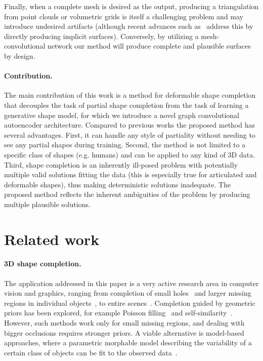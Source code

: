 \documentclass[10pt,twocolumn,letterpaper]{article}
\begin{document}
Finally, when a complete mesh is desired as the output, producing a triangulation from point clouds or volumetric grids is itself a challenging problem and may introduce undesired artifacts (although recent advances such as~\cite{dai2016shape} address this by directly producing implicit surfaces). Conversely, by utilizing a mesh-convolutional network our method will produce complete and plausible surfaces by design.  

\paragraph{Contribution.} The main contribution of this work is a method for deformable shape completion that decouples the task of partial shape completion from the task of learning a generative shape model, for which we introduce a novel graph convolutional autoencoder architecture. Compared to previous works the proposed method has several advantages. First, it can handle any style of partiality without needing to see any partial shapes during training. Second, the method is not limited to a specific class of shapes (e.g. humans) and can be applied to any kind of 3D data. Third, shape completion is an inherently ill-posed problem with potentially multiple valid solutions fitting the data (this is especially true for articulated and deformable shapes), thus making deterministic solutions inadequate. The proposed method reflects the inherent ambiguities of the problem by producing multiple plausible solutions.
\section{Related work}\label{sec:relatedwork}\paragraph{3D shape completion.} 
The application addressed in this paper is a very active research area in computer vision and graphics, ranging from completion of small holes~\cite{sarkar2017learning} and larger missing regions in individual objects~\cite{pointcloudGAN,rock2015completing,varley17iros,wu20153d,sharma16eccvw}, to entire scenes~\cite{song2016semantic}.
Completion guided by geometric priors has been explored, for example Poisson filling~\cite{kazhdan2013screened} and self-similarity~\cite{korman2015peeking,sarkar2017learning,litany2016cloud}. However, such methods work only for small missing regions, and dealing with bigger occlusions requires stronger priors. A viable alternative is model-based approaches, where a parametric morphable model describing the variability of a certain class of objects can be fit to the observed data~\cite{blanz1999morphable,gerig2017morphable}. 
\end{document}
